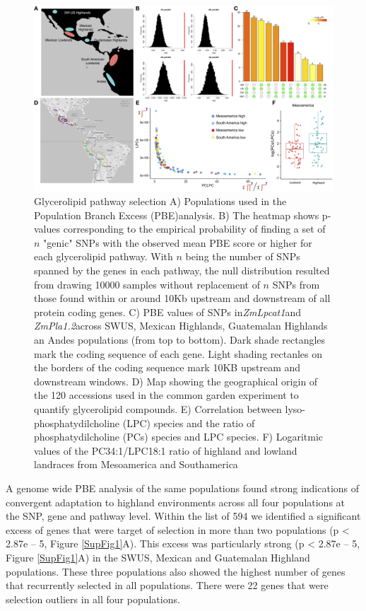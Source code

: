 \documentclass[9pt,twocolumn,twoside,lineno]{gsajnl}
\begin{document}
\begin{figure}[ht]
\begin{center}
\includegraphics[width=0.8\paperwidth]{Figures/Fig_1.png}
\caption{Glycerolipid pathway selection 
A) Populations used in the Population Branch Excess (PBE)analysis. 
B) The heatmap shows p-values corresponding to the empirical probability of finding a set of $n$ "genic" SNPs with the observed mean PBE score or higher for each glycerolipid pathway. With $n$ being the number of SNPs spanned by the genes in each pathway, the null distribution resulted from drawing 10000 samples without replacement of $n$ SNPs from those found within or around 10Kb upstream and downstream of all protein coding genes.
C) PBE values of SNPs in\textit{ZmLpcat1}and\textit{ ZmPla1.2}across SWUS, Mexican Highlands, Guatemalan Highlands an Andes populations (from top to bottom). Dark shade rectangles mark the coding sequence of each gene. Light shading rectanles on the borders of the coding sequence mark 10KB upstream and downstream windows. 
D) Map showing the geographical origin of the 120 accessions used in the common garden experiment to quantify glycerolipid compounds.
E) Correlation between  lyso-phosphatydilcholine (LPC) species and the ratio of  phosphatydilcholine (PCs) species and LPC species. 
F) Logaritmic values of the PC34:1/LPC18:1 ratio of highland and lowland landraces from Mesoamerica and Southamerica}
\label{Fig1}
\end{center}
\end{figure} 
A genome wide PBE analysis of the same populations \cite{Wang2017-bc} found strong indications of convergent adaptation to highland environments across all four populations at the SNP, gene and pathway level.
Within the list of 594 we identified a significant excess of genes that were target of selection in more than two populations (p < 2.87e – 5, Figure \ref{SupFig1}A). This excess was particularly strong (p < 2.87e – 5, Figure \ref{SupFig1}A) in the SWUS, Mexican and Guatemalan Highland populations. 
These three populations also showed the highest number of genes that recurrently selected in all populations. 
There were 22 genes that were selection outliers in all four populations. 
\end{document}
